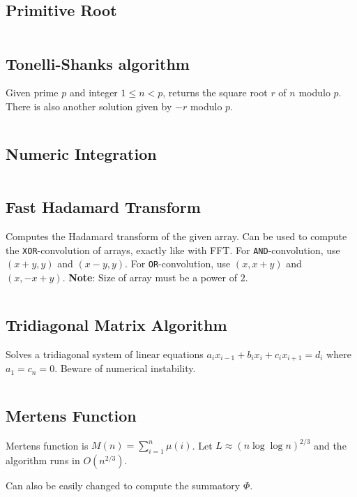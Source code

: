 \documentclass[8pt,a4paper,landscape,oneside]{amsart}
\newcommand{\code}[1]{\inputminted[fontsize=\normalsize,baselinestretch=1,breaklines,tabsize=2]{cpp}{code/#1}}
\newif\ifverbose
\begin{document}
\begin{multicols*}{3}
\code{math/math.cpp}

\subsection{Primitive Root}
\code{math/primitive_root.cpp}

\subsection{Tonelli-Shanks algorithm}
        Given prime $p$ and integer $1\leq n<p$, returns the square root $r$ of
        $n$ modulo $p$. There is also another solution given by $-r$ modulo
        $p$.
        \code{math/tonelli_shanks.cpp}

\subsection{Numeric Integration}
        \ifverbose
        Numeric integration using Simpson's rule.
        \fi
        \code{math/numeric_integration.cpp}

\subsection{Fast Hadamard Transform}
        Computes the Hadamard transform of the given array. Can be used to
        compute the \texttt{XOR}-convolution of arrays, exactly like with FFT.
        For \texttt{AND}-convolution, use $(x+y,y)$ and $(x-y,y)$. For
        \texttt{OR}-convolution, use $(x,x+y)$ and $(x,-x+y)$. \textbf{Note}:
        Size of array must be a power of $2$.
        \code{math/fht.cpp}

\subsection{Tridiagonal Matrix Algorithm}
        Solves a tridiagonal system of linear equations $a_ix_{i-1} + b_ix_i +
        c_ix_{i+1} = d_i$ where $a_1 = c_n = 0$. Beware of numerical
        instability.
        \code{math/tridiagonal.cpp}

\subsection{Mertens Function}
        Mertens function is $M(n) = \sum_{i=1}^n \mu(i)$. Let $L\approx
        (n\log{\log{n}})^{2/3}$ and the algorithm runs in $O(n^{2/3})$.
        \ifverbose
        \else
            Can also be easily changed to compute the summatory $\Phi$.
        \fi
        \code{math/mertens.cpp}
    \ifverbose
    

\end{multicols*}
\end{document}
